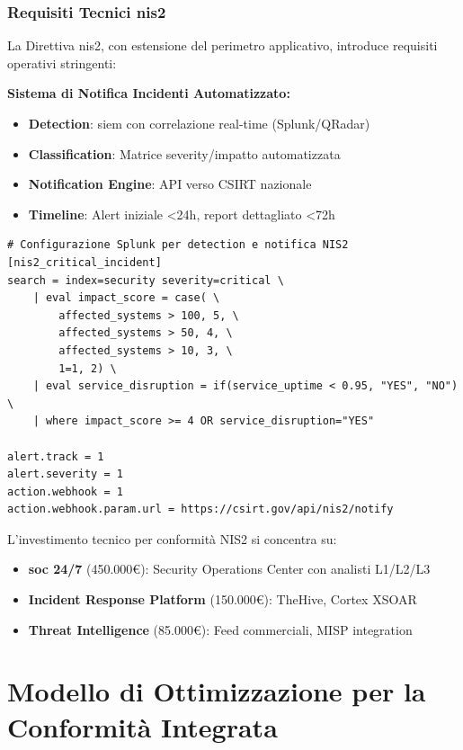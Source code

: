 \subsubsection{Requisiti Tecnici \gls{nis2}}

La Direttiva \gls{nis2}, con estensione del perimetro applicativo, introduce requisiti operativi stringenti\autocite{ENISA2024nis2}:

\textbf{Sistema di Notifica Incidenti Automatizzato:}
\begin{itemize}
    \item \textbf{Detection}: \gls{siem} con correlazione real-time (Splunk/QRadar)
    \item \textbf{Classification}: Matrice severity/impatto automatizzata
    \item \textbf{Notification Engine}: API verso CSIRT nazionale
    \item \textbf{Timeline}: Alert iniziale <24h, report dettagliato <72h
\end{itemize}

\begin{lstlisting}[caption={Pipeline Notifica \gls{nis2}},label={lst:nis2_notification}]
# Configurazione Splunk per detection e notifica NIS2
[nis2_critical_incident]
search = index=security severity=critical \
    | eval impact_score = case( \
        affected_systems > 100, 5, \
        affected_systems > 50, 4, \
        affected_systems > 10, 3, \
        1=1, 2) \
    | eval service_disruption = if(service_uptime < 0.95, "YES", "NO") \
    | where impact_score >= 4 OR service_disruption="YES"

alert.track = 1
alert.severity = 1
action.webhook = 1
action.webhook.param.url = https://csirt.gov/api/nis2/notify
\end{lstlisting}

L'investimento tecnico per conformità NIS2 si concentra su:
\begin{itemize}
    \item \textbf{\gls{soc} 24/7} (450.000€): Security Operations Center con analisti L1/L2/L3
    \item \textbf{Incident Response Platform} (150.000€): TheHive, Cortex XSOAR
    \item \textbf{Threat Intelligence} (85.000€): Feed commerciali, MISP integration
\end{itemize}
\section{\texorpdfstring{\textbf{Modello di Ottimizzazione per la Conformità Integrata}}{4.3 - Modello di Ottimizzazione per la Conformità Integrata}}

